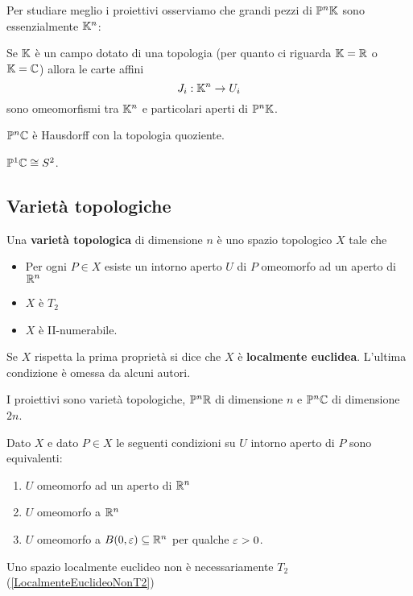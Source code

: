 \begin{multicols*}{2}
\noindent
Per studiare meglio i proiettivi osserviamo che grandi pezzi di $\mathbb{P}^n\mathbb{K}$ sono essenzialmente $\mathbb{K}^n$:
\begin{proposition}\label{CarteAffiniSonoOmeomorfismi}
Se $\mathbb{K}$ \`e un campo dotato di una topologia (per quanto ci riguarda $\mathbb{K}=\mathbb{R}$ o $\mathbb{K}=\mathbb{C}$) allora le carte affini
\[J_i:\mathbb{K}^n\to U_i\]
sono omeomorfismi tra $\mathbb{K}^n$ e particolari aperti di $\mathbb{P}^n\mathbb{K}$.
\end{proposition}

\begin{proposition}
$\mathbb{P}^n\mathbb{C}$ \`e Hausdorff con la topologia quoziente.
\end{proposition}


\begin{corollary}
$\mathbb{P}^1\mathbb{C}\cong S^2$.
\end{corollary}

\subsection{Variet\`a topologiche}
\begin{definition}
Una \textbf{variet\`a topologica} di dimensione $n$ \`e uno spazio topologico $X$ tale che
\begin{itemize}[noitemsep]
\item Per ogni $P\in X$ esiste un intorno aperto $U$ di $P$ omeomorfo ad un aperto di $\mathbb{R}^n$
\item $X$ \`e $T_2$
\item $X$ \`e II-numerabile.
\end{itemize}
\end{definition}
\begin{remark}
Se $X$ rispetta la prima propriet\`a si dice che $X$ \`e \textbf{localmente euclidea}. L'ultima condizione \`e omessa da alcuni autori.
\end{remark}

\begin{remark}
I proiettivi sono variet\`a topologiche, $\mathbb{P}^n\mathbb{R}$ di dimensione $n$ e $\mathbb{P}^n\mathbb{C}$ di dimensione $2n$.
\end{remark}

\begin{proposition}
Dato $X$ e dato $P\in X$ le seguenti condizioni su $U$ intorno aperto di $P$ sono equivalenti:
\begin{enumerate}[noitemsep]
\item $U$ omeomorfo ad un aperto di $\mathbb{R}^n$
\item $U$ omeomorfo a $\mathbb{R}^n$
\item $U$ omeomorfo a $B(0,\varepsilon)\subseteq \mathbb{R}^n$ per qualche $\varepsilon>0$.
\end{enumerate}
\end{proposition}

\begin{remark}
Uno spazio localmente euclideo non \`e necessariamente $T_2$ (\ref{LocalmenteEuclideoNonT2})
\end{remark}


\end{multicols*}
